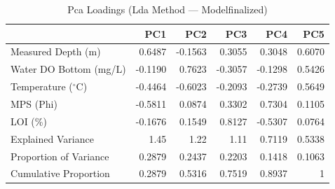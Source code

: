 \begin{table}[htbp]
  \centering
  \caption{Pca Loadings (Lda Method — Modelfinalized)}
  \label{tab:LDA_Method_ModelFinalized_tables_pca_loadings}
  \begin{tabular}{lrrrrr}
    \toprule
     & PC1 & PC2 & PC3 & PC4 & PC5 \\
    \midrule
    Measured Depth (m) & 0.6487 & -0.1563 & 0.3055 & 0.3048 & 0.6070 \\
    Water DO Bottom (mg/L) & -0.1190 & 0.7623 & -0.3057 & -0.1298 & 0.5426 \\
    Temperature ($^{\circ}$C) & -0.4464 & -0.6023 & -0.2093 & -0.2739 & 0.5649 \\
    MPS (Phi) & -0.5811 & 0.0874 & 0.3302 & 0.7304 & 0.1105 \\
    LOI (\%) & -0.1676 & 0.1549 & 0.8127 & -0.5307 & 0.0764 \\
    Explained Variance & 1.45 & 1.22 & 1.11 & 0.7119 & 0.5338 \\
    Proportion of Variance & 0.2879 & 0.2437 & 0.2203 & 0.1418 & 0.1063 \\
    Cumulative Proportion & 0.2879 & 0.5316 & 0.7519 & 0.8937 & 1 \\
    \bottomrule
  \end{tabular}
\end{table}
